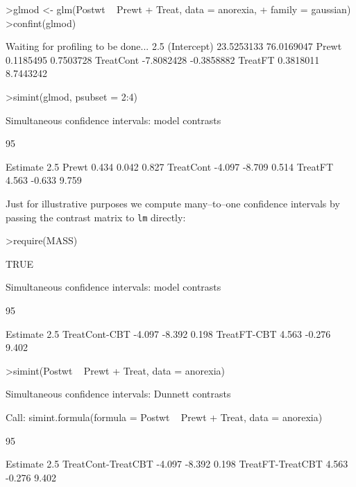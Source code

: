 \documentclass{article}
\begin{document}
\begin{Schunk}
\begin{Sinput}
>glmod <- glm(Postwt ~ Prewt + Treat, data = anorexia, 
+     family = gaussian)
>confint(glmod)
\end{Sinput}
\begin{Soutput}
Waiting for profiling to be done...
                 2.5 %     97.5 %
(Intercept) 23.5253133 76.0169047
Prewt        0.1185495  0.7503728
TreatCont   -7.8082428 -0.3858882
TreatFT      0.3818011  8.7443242
\end{Soutput}
\begin{Sinput}
>simint(glmod, psubset = 2:4)
\end{Sinput}
\begin{Soutput}
	Simultaneous confidence intervals: model contrasts

	95 % confidence intervals

          Estimate  2.5 % 97.5 %
Prewt        0.434  0.042  0.827
TreatCont   -4.097 -8.709  0.514
TreatFT      4.563 -0.633  9.759
\end{Soutput}
\end{Schunk}
\normalsize

Just for illustrative purposes we compute many--to--one confidence intervals
by passing the contrast matrix to \texttt{lm} directly:
\small
\begin{Schunk}
\begin{Sinput}
>require(MASS)
\end{Sinput}
\begin{Soutput}
[1] TRUE
\end{Soutput}
\begin{Soutput}
	Simultaneous confidence intervals: model contrasts

	95 % confidence intervals

              Estimate  2.5 % 97.5 %
TreatCont-CBT   -4.097 -8.392  0.198
TreatFT-CBT      4.563 -0.276  9.402
\end{Soutput}
\begin{Sinput}
>simint(Postwt ~ Prewt + Treat, data = anorexia)
\end{Sinput}
\begin{Soutput}
	Simultaneous confidence intervals: Dunnett
	contrasts

Call: 
simint.formula(formula = Postwt ~ Prewt + Treat, data = anorexia)

	95 % confidence intervals

                   Estimate  2.5 % 97.5 %
TreatCont-TreatCBT   -4.097 -8.392  0.198
TreatFT-TreatCBT      4.563 -0.276  9.402
\end{Soutput}
\end{Schunk}
\normalsize
\end{document}
